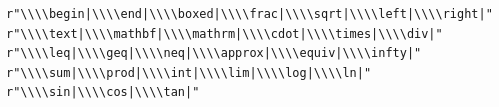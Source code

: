 \documentclass[]{jingdong}
\theoremstyle{plain}
\theoremstyle{definition}
\theoremstyle{remark}
\begin{document}
\par\noindent\begin{minipage}{\linewidth}
\footnotesize
\begin{verbatim}
r"\\\\begin|\\\\end|\\\\boxed|\\\\frac|\\\\sqrt|\\\\left|\\\\right|"
r"\\\\text|\\\\mathbf|\\\\mathrm|\\\\cdot|\\\\times|\\\\div|"
r"\\\\leq|\\\\geq|\\\\neq|\\\\approx|\\\\equiv|\\\\infty|"
r"\\\\sum|\\\\prod|\\\\int|\\\\lim|\\\\log|\\\\ln|"
r"\\\\sin|\\\\cos|\\\\tan|"

\end{verbatim}
\end{minipage}
\end{document}
